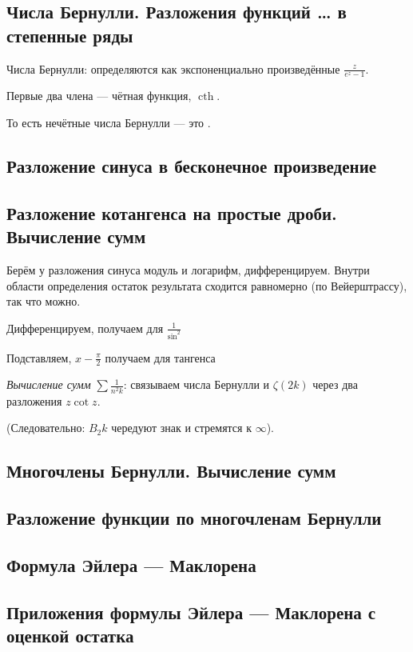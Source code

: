 \documentclass[12pt, a4paper, oneside]{memoir}
\begin{document}
\subsection{Числа Бернулли. Разложения функций … в степенные ряды}

Числа Бернулли: определяются как экспоненциально произведённые $\frac{z}{e^z - 1}$.

Первые два члена — чётная функция, $\operatorname{cth}$.

То есть нечётные числа Бернулли — это .

\subsection{Разложение синуса в бесконечное произведение}

\subsection{Разложение котангенса на простые дроби. Вычисление сумм}

Берём у разложения синуса модуль и логарифм, дифференцируем.
Внутри области определения остаток результата сходится равномерно (по Вейерштрассу), так что можно. 

Дифференцируем, получаем для $\frac{1}{\sin^2}$

Подставляем, $x - \frac{\pi}{2}$ получаем для тангенса


\textit{Вычисление сумм} $\sum \frac{1}{n^2k}$: связываем числа Бернулли и $\zeta(2k)$
через два разложения $z \cot z$.

(Следовательно: $B_2k$ чередуют знак и стремятся к $∞$).

\subsection{Многочлены Бернулли. Вычисление сумм}


\subsection{Разложение функции по многочленам Бернулли}


\subsection{Формула Эйлера — Маклорена}


\subsection{Приложения формулы Эйлера — Маклорена с оценкой остатка}
\end{document}
